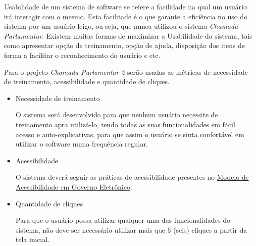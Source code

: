 
Usabilidade de um sistema de software se refere a facilidade na qual um usuário irá interagir com o mesmo. Esta facilitade é o que garante a eficiência no uso do sistema por um usuário leigo, ou seja, que nunca utilizou o sistema \textit{Chamada Parlamentar}. Existem muitas formas de maximizar a Usabilidade do sistema, tais como apresentar opção de treinamento, opção de ajuda, disposição dos itens de forma a facilitar o reconhecimento do usuário e etc.

Para o projeto \textit{Chamada Parlamentar 2} serão usadas as métricas de necessidade de treinamento, acessibilidade e quantidade de cliques.

\begin{itemize}

	\item{Necessidade de treinamento}

		O sistema será desenvolvido para que nenhum usuário necessite de treinamento apra utilizá-lo, tendo todas as suas funcionalidades em fácil acesso e auto-explicativas, para que assim o usuário se sinta confortável em utilizar o software numa frequência regular.

	\item{Acessibilidade}

		O sistema deverá seguir as práticas de acessibilidade presentes no \href{http://www.governoeletronico.gov.br/acoes-e-projetos/e-MAG}{Modelo de Acessibilidade em Governo Eletrônico}\cite{eMAG}.

	\item{Quantidade de cliques}

		Para que o usuário possa utilizar qualquer uma das funcionalidades do sistema, não deve ser necessário utilizar mais que 6 (seis) cliques a partir da tela inicial.

\end{itemize}